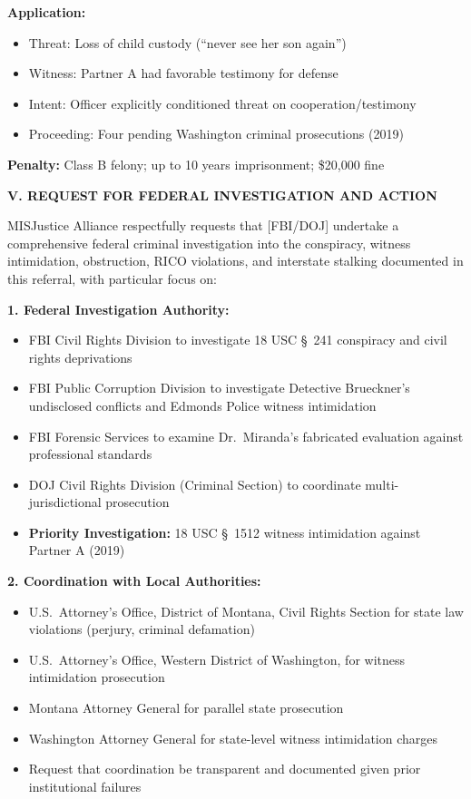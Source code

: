 \documentclass[11pt, letterpaper]{article}
\newcommand{\sectiontitle}[1]{\vspace{0.2in}\noindent\textcolor{NavyBlue}{\large\textbf{#1}}\vspace{0.1in}}
\newcommand{\subsectiontitle}[1]{\vspace{0.15in}\noindent\textcolor{NavyBlue}{\textbf{#1}}\vspace{0.05in}}
\begin{document}
\textbf{Application:}
\begin{itemize}[leftmargin=*,itemsep=2pt]
    \item Threat: Loss of child custody (``never see her son again'')
    \item Witness: Partner A had favorable testimony for defense
    \item Intent: Officer explicitly conditioned threat on cooperation/testimony
    \item Proceeding: Four pending Washington criminal prosecutions (2019)
\end{itemize}

\textbf{Penalty:} Class B felony; up to 10 years imprisonment; \$20,000 fine

\sectiontitle{V. REQUEST FOR FEDERAL INVESTIGATION AND ACTION}

MISJustice Alliance respectfully requests that [FBI/DOJ] undertake a comprehensive federal criminal investigation into the conspiracy, witness intimidation, obstruction, RICO violations, and interstate stalking documented in this referral, with particular focus on:

\subsectiontitle{1. Federal Investigation Authority:}
\begin{itemize}[leftmargin=*,itemsep=2pt]
    \item FBI Civil Rights Division to investigate 18 USC \S\ 241 conspiracy and civil rights deprivations
    \item FBI Public Corruption Division to investigate Detective Brueckner's undisclosed conflicts and Edmonds Police witness intimidation
    \item FBI Forensic Services to examine Dr.\ Miranda's fabricated evaluation against professional standards
    \item DOJ Civil Rights Division (Criminal Section) to coordinate multi-jurisdictional prosecution
    \item \textbf{Priority Investigation:} 18 USC \S\ 1512 witness intimidation against Partner A (2019)
\end{itemize}

\subsectiontitle{2. Coordination with Local Authorities:}
\begin{itemize}[leftmargin=*,itemsep=2pt]
    \item U.S.\ Attorney's Office, District of Montana, Civil Rights Section for state law violations (perjury, criminal defamation)
    \item U.S.\ Attorney's Office, Western District of Washington, for witness intimidation prosecution
    \item Montana Attorney General for parallel state prosecution
    \item Washington Attorney General for state-level witness intimidation charges
    \item Request that coordination be transparent and documented given prior institutional failures
\end{itemize}
\end{document}
